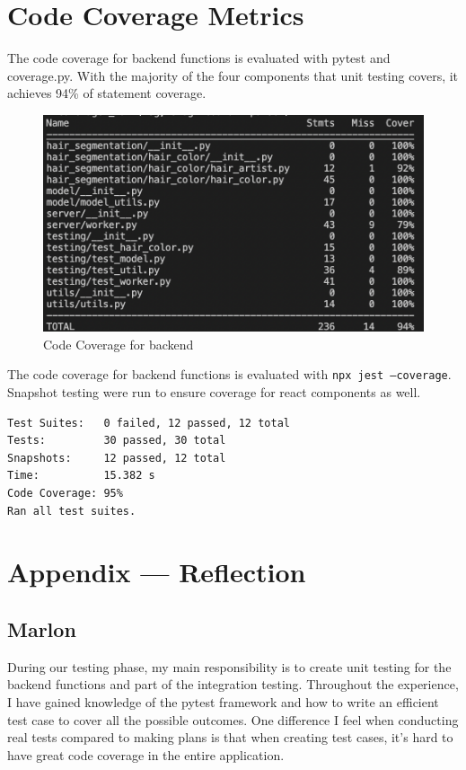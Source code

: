 \documentclass[12pt, titlepage]{article}
\begin{document}
\section{Code Coverage Metrics}

The code coverage for backend functions is evaluated with pytest and coverage.py. With the majority of the four components that unit testing covers, it achieves 94\% of statement coverage.

\begin{figure}[h]
  \centering
  \includegraphics[width=0.8\linewidth]{VnVReport/be_cover.png}
  \caption{Code Coverage for backend}
\end{figure}

\newline
\noindent The code coverage for backend functions is evaluated with \texttt{npx jest --coverage}. Snapshot testing were run to ensure coverage for react components as well. \\
\begin{verbatim}
Test Suites:   0 failed, 12 passed, 12 total
Tests:         30 passed, 30 total
Snapshots:     12 passed, 12 total
Time:          15.382 s
Code Coverage: 95%
Ran all test suites.
\end{verbatim}





\newpage{}
\section{Appendix --- Reflection}

\subsection{Marlon}
During our testing phase, my main responsibility is to create unit testing for the backend functions and part of the integration testing. Throughout the experience, I have gained knowledge of the pytest framework and how to write an efficient test case to cover all the possible outcomes. One difference I feel when conducting real tests compared to making plans is that when creating test cases, it's hard to have great code coverage in the entire application. 
\end{document}
